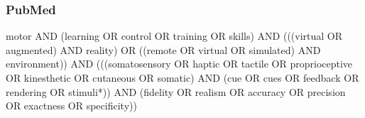 \documentclass[conference]{IEEEtran}
\begin{document}
\subsubsection{PubMed}
motor AND (learning OR control OR training OR skills) AND (((virtual OR augmented) AND reality) OR ((remote OR virtual OR simulated) AND environment)) AND (((somatosensory OR haptic OR tactile OR proprioceptive OR kinesthetic OR cutaneous OR somatic) AND (cue OR cues OR feedback OR rendering OR stimuli*)) AND (fidelity OR realism OR accuracy OR precision OR exactness OR specificity))




\end{document}
